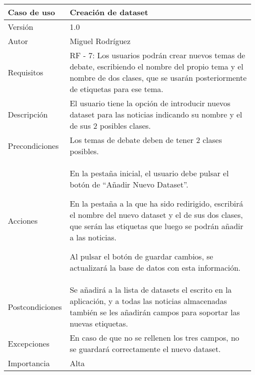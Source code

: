 \begin{center}
\begin{tabular}{ | m{3cm} | m{10cm}| } 
\hline
Caso de uso & Creación de dataset \\ 
\hline
Versión & 1.0 \\ 
\hline
Autor & Miguel Rodríguez \\ 
\hline
Requisitos & RF - 7: Los usuarios podrán crear nuevos temas de debate, escribiendo el nombre del propio tema y el nombre de dos clases, que se usarán posteriormente de etiquetas para ese tema. \\ 
\hline
Descripción & El usuario tiene la opción de introducir nuevos dataset para las noticias indicando su nombre y el de sus 2 posibles clases. \\
\hline
Precondiciones & Los temas de debate deben de tener 2 clases posibles. \\
\hline
Acciones & En la pestaña inicial, el usuario debe pulsar el botón de ``Añadir Nuevo Dataset''.

En la pestaña a la que ha sido redirigido, escribirá el nombre del nuevo dataset y el de sus dos clases, que serán las etiquetas que luego se podrán añadir a las noticias.

Al pulsar el botón de guardar cambios, se actualizará la base de datos con esta información. \\
\hline
Postcondiciones & Se añadirá a la lista de datasets el escrito en la aplicación, y a todas las noticias almacenadas también se les añadirán campos para soportar las nuevas etiquetas.\\
\hline
Excepciones & En caso de que no se rellenen los tres campos, no se guardará correctamente el nuevo dataset. \\
\hline 
Importancia & Alta \\
\hline 
\end{tabular}
\end{center}